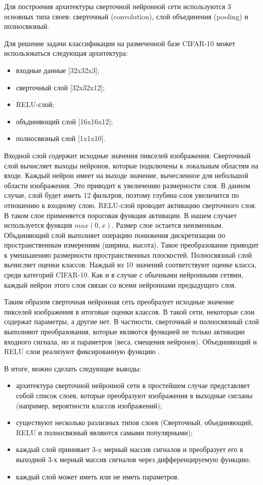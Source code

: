 \documentclass[a4paper,english,russian]{G2-105}
\begin{document}
\par Для построения архитектуры сверточной нейронной сети используются 3 основных типа своев: сверточный (convolution), слой объединения (pooling) и полносвязный. 
\par Для решение задачи классификации на размеченной базе CIFAR-10 может использоваться следующая архитектура:
\begin{itemize}
\item входные данные [32x32x3]; 
\item сверточный слой [32x32x12]; 
\item RELU-слой;
\item объдиняющий слой [16x16x12];
\item полносвязный слой [1x1x10].
\end{itemize}
\par Входной слой содержит исходные значения пикселей изображения. Сверточный слой вычисляет выходы нейронов, которые подключены к локальным областям на входе. Каждый нейрон имеет на выходе значение, вычесленное для небольшой области изображения. Это приводит к увеличению размерности слоя. В данном случае, слой будет иметь 12 фильтров, поэтому глубина слоя увеличится по отношению к входному слою. RELU-слой проводит активацию сверточного слоя. В таком слое применяется пороговая функция активации. В нашем случает используется функция $max(0, x)$. Размер слое остается неизменным. Объдиняющий слой выполняет операцию понижения дискретизации по пространственным измерениям (ширина, высота). Такое преобразование приводит к умешьшению размерности пространственных плоскостей. Полносвязный слой вычисляет оценки классов. Наждый из 10 значений соответствуют оценке класса, среди категорий CIFAR-10. Как и в случае с обычными нейронными сетями, каждый нейрон этого слоя связан со всеми нейроннами предыдущего слоя.
\par Таким образом сверточная нейронная сеть преобразует исходные значение пикселей изображения в итоговые оценки классов. В такой сети, некоторые слои содержат параметры, а другие нет. В частности, сверточный и полносвязный слой выполняют преобразования, которые являются функцией не только активации входного сигнала, но и параметров (веса, смещения нейронов). Объединяющий и RELU слои реализуют фиксированную функцию \cite{10}. 
\par В итоге, можно сделать следующие выводы:
\begin{itemize}
\item архитектура сверточной нейронной сети в простейшем случае представляет собой список слоев, которые преобразуют изображения в выходные сигланы (например, вероятности классов изображений);
\item существуют несколько разлизных типов слоев (Сверточный, объединяющий, RELU и полносвязный являются самыми популярными);
\item каждый слой принивает 3-x мерный массив сигналов и преобразует его в выходной 3-х мерный массив сигналов через дифференцируемую функцию;
\item каждый слой может иметь или не иметь параметров.
\end{itemize}
\end{document}
